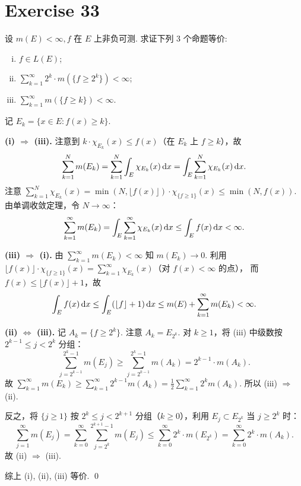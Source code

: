 \documentclass{article}
\begin{document}
\section{Exercise 33}

设 $m(E) < \infty, f$ 在 $E$ 上非负可测. 求证下列 3 个命题等价:
\begin{enumerate}[(i)]
  \item $f \in L(E)$;
  \item $\sum_{k=1}^{\infty} 2^k \cdot m(\{f \ge 2^k\}) < \infty$;
  \item $\sum_{k=1}^{\infty} m(\{f \ge k\}) < \infty$.
\end{enumerate}

\begin{solution}
  记 $E_k = \{x \in E : f(x) \ge k\}$.

  \textbf{(i) $\Rightarrow$ (iii).}\quad
  注意到 $k \cdot \chi_{E_k}(x) \le f(x)$（在 $E_k$ 上 $f \ge k$），故
  \[
    \sum_{k=1}^{N} m(E_k) = \sum_{k=1}^{N} \int_E \chi_{E_k}(x)\,\mathrm{d} x
    = \int_E \sum_{k=1}^{N} \chi_{E_k}(x)\,\mathrm{d} x.
  \]
  注意 $\sum_{k=1}^{N} \chi_{E_k}(x) = \min(N, \lfloor f(x) \rfloor) \cdot \chi_{\{f \ge 1\}}(x) \le \min(N, f(x))$.
  由单调收敛定理，令 $N \to \infty$：
  \[
    \sum_{k=1}^{\infty} m(E_k) = \int_E \sum_{k=1}^{\infty} \chi_{E_k}(x)\,\mathrm{d} x \le \int_E f(x)\,\mathrm{d} x < \infty.
  \]

  \textbf{(iii) $\Rightarrow$ (i).}\quad
  由 $\sum_{k=1}^{\infty} m(E_k) < \infty$ 知 $m(E_k) \to 0$.
  利用 $\lfloor f(x) \rfloor \cdot \chi_{\{f \ge 1\}}(x) = \sum_{k=1}^{\infty} \chi_{E_k}(x)$（对 $f(x) < \infty$ 的点），
  而 $f(x) \le \lfloor f(x) \rfloor + 1$，故
  \[
    \int_E f(x)\,\mathrm{d} x \le \int_E (\lfloor f \rfloor + 1)\,\mathrm{d} x
    \le m(E) + \sum_{k=1}^{\infty} m(E_k) < \infty.
  \]

  \textbf{(ii) $\Leftrightarrow$ (iii).}\quad
  记 $A_k = \{f \ge 2^k\}$. 注意 $A_k = E_{2^k}$.
  对 $k \ge 1$，将 (iii) 中级数按 $2^{k-1} \le j < 2^k$ 分组：
  \[
    \sum_{j=2^{k-1}}^{2^k - 1} m(E_j) \ge \sum_{j=2^{k-1}}^{2^k - 1} m(A_k) = 2^{k-1} \cdot m(A_k).
  \]
  故 $\sum_{k=1}^{\infty} m(E_k) \ge \sum_{k=1}^{\infty} 2^{k-1} m(A_k) = \frac{1}{2}\sum_{k=1}^{\infty} 2^k m(A_k)$.
  所以 (iii) $\Rightarrow$ (ii).

  反之，将 $\{j \ge 1\}$ 按 $2^k \le j < 2^{k+1}$ 分组（$k \ge 0$），利用 $E_j \subset E_{2^k}$ 当 $j \ge 2^k$ 时：
  \[
    \sum_{j=1}^{\infty} m(E_j)
    = \sum_{k=0}^{\infty} \sum_{j=2^k}^{2^{k+1}-1} m(E_j)
    \le \sum_{k=0}^{\infty} 2^k \cdot m(E_{2^k})
    = \sum_{k=0}^{\infty} 2^k \cdot m(A_k).
  \]
  故 (ii) $\Rightarrow$ (iii).

  综上 (i), (ii), (iii) 等价. \qed
\end{solution}
\end{document}
